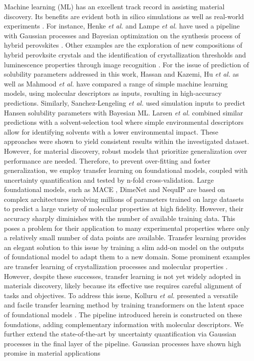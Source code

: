 \documentclass[
  english,        %
  font=times,     %
  onecolumn,      %
]{article}
\begin{document}
Machine learning (ML) has an excellent track record in assisting material discovery. Its benefits are evident both in silico simulations \cite{kouroudis2023utilizing} as well as  real-world experiments \cite{mayr2022machine}. For instance, Henke \textit{et al.} and Lampe \textit{et al.} have used a  pipeline with Gaussian processes and Bayesian optimization on the synthesis process of hybrid perovskites \cite{henke2025synthesizer, lampe2023rapid}. Other examples are the exploration of new compositions of hybrid perovksite crystals \cite{pilania2016finding} and the identification of crystallization thresholds and luminescence properties  through image recognition  \cite{kirman2020machine,harth2023optoelectronic}. For the issue of prediction of solubility parameters addressed in this work, Hassan and Kazemi\cite{solubility_1}, Hu \textit{et al.}\cite{huPredictionDonorNumber2024} as well as Mahmood \textit{et al.} \cite{mahmood2023easy} have compared a range of simple machine learning models, using molecular descriptors as inputs, resulting in high-accuracy predictions. Similarly, Sanchez-Lengeling \textit{et al.} \cite{solubility_2} used simulation inputs to predict Hansen solubility parameters with Bayesian ML. Larsen \textit{et al.} combined similar predictions with a solvent-selection tool where simple environmental descriptors allow for identifying solvents with a lower environmental impact\cite{solubility_3}. These approaches were shown to yield consistent results within the investigated dataset. However, for material discovery, robust models that prioritize generalization over performance are needed. Therefore, to prevent over-fitting and foster generalization, we employ transfer learning on foundational models, coupled with uncertainty quantification and tested by n-fold cross-validation. Large foundational models, such as MACE \cite{MACE}, DimeNet \cite{dimenet} and NequIP \cite{batzner20223} are based on complex architectures involving millions of parameters trained on large datasets to predict a large variety of molecular properties at high fidelity. However, their accuracy sharply diminishes with the number of available training data. This poses a problem for their application to many experimental properties where only a relatively small number of data points are available. Transfer learning provides an elegant solution to this issue by training a slim add-on model on the outputs of foundational model to adapt them to a new domain. Some prominent examples are transfer learning of crystallization processes\cite{CRYSTAL_TRANSFER} and molecular properties \cite{yamada2019predicting}. However, despite these successes, transfer learning is not yet widely adopted in materials discovery, likely because its effective use requires careful alignment of tasks and objectives. To address this issue, Kolluru \textit{et al.} presented a versatile and facile transfer learning method by training transformers on the latent space of foundational models \cite{TAAG}. The pipeline introduced herein is constructed on these foundations, adding complementary information with molecular descriptors. We further extend the state-of-the-art by uncertainty quantification via Gaussian processes in the final layer of the pipeline. Gaussian processes have shown high promise in material applications 
\end{document}
